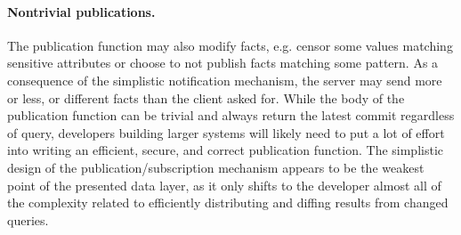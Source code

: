 \paragraph{Nontrivial publications.}
The publication function may also modify facts, e.g. censor some values matching sensitive attributes or choose to not publish facts matching some pattern. As a consequence of the simplistic notification mechanism, the server may send more or less, or different facts than the client asked for. While the body of the publication function can be trivial and always return the latest commit regardless of query, developers building larger systems will likely need to put a lot of effort into writing an efficient, secure, and correct publication function. The simplistic design of the publication/subscription mechanism appears to be the weakest point of the presented data layer, as it only shifts to the developer almost all of the complexity related to efficiently distributing and diffing results from changed queries.
